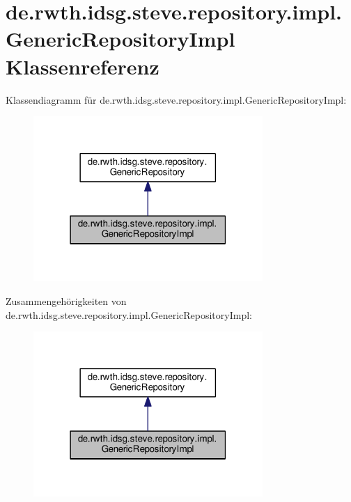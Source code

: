 \hypertarget{classde_1_1rwth_1_1idsg_1_1steve_1_1repository_1_1impl_1_1_generic_repository_impl}{\section{de.\+rwth.\+idsg.\+steve.\+repository.\+impl.\+Generic\+Repository\+Impl Klassenreferenz}
\label{classde_1_1rwth_1_1idsg_1_1steve_1_1repository_1_1impl_1_1_generic_repository_impl}
}


Klassendiagramm für de.\+rwth.\+idsg.\+steve.\+repository.\+impl.\+Generic\+Repository\+Impl\+:\nopagebreak
\begin{figure}[H]
\begin{center}
\leavevmode
\includegraphics[width=247pt]{classde_1_1rwth_1_1idsg_1_1steve_1_1repository_1_1impl_1_1_generic_repository_impl__inherit__graph}
\end{center}
\end{figure}


Zusammengehörigkeiten von de.\+rwth.\+idsg.\+steve.\+repository.\+impl.\+Generic\+Repository\+Impl\+:\nopagebreak
\begin{figure}[H]
\begin{center}
\leavevmode
\includegraphics[width=247pt]{classde_1_1rwth_1_1idsg_1_1steve_1_1repository_1_1impl_1_1_generic_repository_impl__coll__graph}
\end{center}
\end{figure}
